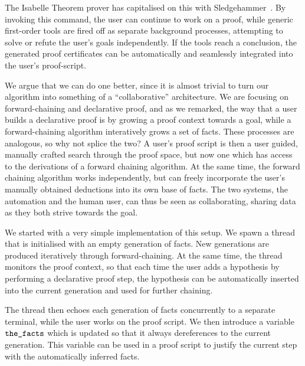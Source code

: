 The Isabelle Theorem prover has capitalised on this with Sledgehammer~\cite{IsabelleSledgehammer}. By invoking this command, the user can continue to work on a proof, while generic first-order tools are fired off as separate background processes, attempting to solve or refute the user's goals independently. If the tools reach a conclusion, the generated proof certificates can be automatically and seamlessly integrated into the user's proof-script. 

We argue that we can do one better, since it is almost trivial to turn our algorithm into something of a ``collaborative'' architecture. We are focusing on forward-chaining and declarative proof, and as we remarked, the way that a user builds a declarative proof is by growing a proof context towards a goal, while a forward-chaining algorithm interatively grows a set of facts. These processes are analogous, so why not splice the two? A user's proof script is then a user guided, manually crafted search through the proof space, but now one which has access to the derivations of a forward chaining algorithm. At the same time, the forward chaining algorithm works independently, but can freely incorporate the user's manually obtained deductions into its own base of facts. The two systems, the automation and the human user, can thus be seen as collaborating, sharing data as they both strive towards the goal. 

We started with a very simple implementation of this setup. We spawn a thread that is initialised with an empty generation of facts. New generations are produced iteratively through forward-chaining. At the same time, the thread  monitors the proof context, so that each time the user adds a hypothesis by performing a declarative proof step, the hypothesis can be automatically inserted into the current generation and used for further chaining.

The thread then echoes each generation of facts concurrently to a separate terminal, while the user works on the proof script. We then introduce a variable $\texttt{the\_facts}$ which is updated so that it always dereferences to the current generation. This variable can be used in a proof script to justify the current step with the automatically inferred facts. 


